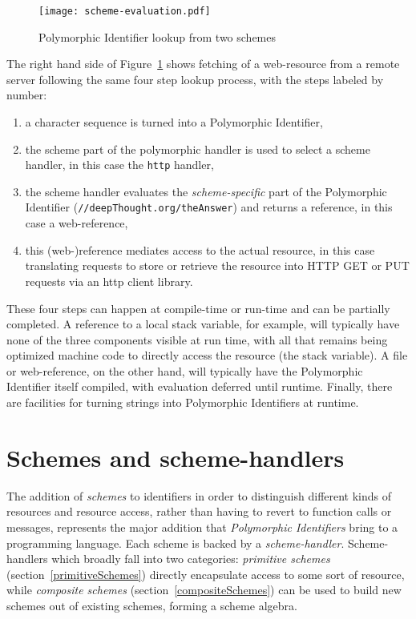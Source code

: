 \documentclass[preprint,authoryear]{llncs}
\begin{document}
\begin{figure}[htbp]
\begin{center}
\texttt{[image: scheme-evaluation.pdf]}
\caption{Polymorphic Identifier lookup from two schemes}
\label{scheme-eval}
\end{center}
\end{figure}


The right hand side of Figure~\ref{scheme-eval} shows fetching of a web-resource from
a remote server following the same four step lookup process, with the steps labeled by
number:

\begin{enumerate}
\item a character sequence is turned into a Polymorphic Identifier,
\item the scheme part of the polymorphic handler is used to select a scheme handler, in this case the {\tt http} handler,
\item the scheme handler evaluates the \emph{scheme-specific} part of the Polymorphic Identifier ({\tt //deepThought.org/theAnswer})
	 and returns a reference, in this case a web-reference,
\item this (web-)reference mediates access to the actual resource, in this case translating requests to store or retrieve the 
	resource into HTTP GET or PUT requests via an http client library.
\end{enumerate}

These four steps can happen at compile-time or run-time and can be partially completed.
A reference to a local stack variable, for example, will typically have none of the
three components visible at run time, with all that remains being optimized 
machine code to directly access the resource (the stack variable).
A file or web-reference, on the other hand, will typically have the Polymorphic Identifier itself
compiled, with evaluation deferred until runtime.  Finally, there are facilities
for turning strings into Polymorphic Identifiers at runtime.


\section{Schemes and scheme-handlers}
\label{schemes}
The addition of \emph{schemes} to identifiers in order to distinguish different kinds of resources
and resource access, rather than having to revert to function calls or messages, represents
the major addition that \emph{Polymorphic Identifiers} bring to a programming language.
Each scheme is backed by a \emph{scheme-handler}.  Scheme-handlers which broadly fall into two categories:
 \emph{primitive schemes} (section~\ref{primitiveSchemes})
directly encapsulate access to some sort of resource, while \emph{composite schemes} (section~\ref{compositeSchemes})
can be used to build new schemes out of existing schemes, forming a scheme algebra.
\end{document}
